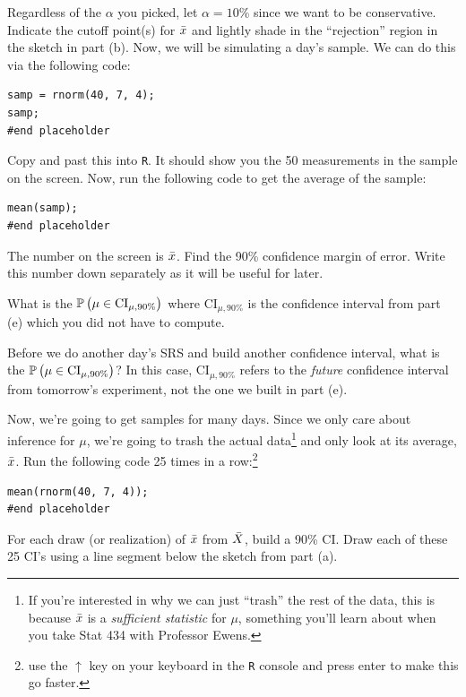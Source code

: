 \documentclass[12pt]{article}
\begin{document}
\easysubproblem Regardless of the $\alpha$ you picked, let $\alpha = 10\%$ since we want to be conservative. Indicate the cutoff point(s) for $\bar{x}$ and lightly shade in the ``rejection'' region in the sketch in part (b).
\easysubproblem Now, we will be simulating a day's sample. We can do this via the following code:

\begin{verbatim}
samp = rnorm(40, 7, 4); 
samp; 
#end placeholder
\end{verbatim}

Copy and past this into \texttt{R}. It should show you the 50 measurements in the sample on the screen. Now, run the following code to get the average of the sample:

\begin{verbatim}
mean(samp);
#end placeholder
\end{verbatim}

The number on the screen is $\bar{x}$. Find the 90\% confidence margin of error. Write this number down separately as it will be useful for later.

\hardsubproblem What is the $\mathbb{P}\left(\mu \in \text{CI}_{\mu, 90\%}\right)$ where $\text{CI}_{\mu, 90\%}$ is the confidence interval from part (e) which you did not have to compute.

\easysubproblem Before we do another day's SRS and build another confidence interval, what is the $\mathbb{P}\left(\mu \in \text{CI}_{\mu, 90\%}\right)$? In this case, $\text{CI}_{\mu, 90\%}$ refers to the \textit{future} confidence interval from tomorrow's experiment, not the one we built in part (e).

\intermediatesubproblem Now, we're going to get samples for many days. Since we only care about inference for $\mu$, we're going to trash the actual data\footnote{If you're interested in why we can just ``trash'' the rest of the data, this is because $\bar{x}$ is a \textit{sufficient statistic} for $\mu$, something you'll learn about when you take Stat 434 with Professor Ewens.} and only look at its average, $\bar{x}$. Run the following code 25 times in a row:\footnote{use the $\uparrow$ key on your keyboard in the \texttt{R} console and press enter to make this go faster.}

\begin{verbatim}
mean(rnorm(40, 7, 4));
#end placeholder
\end{verbatim}

For each draw (or realization) of $\bar{x}$ from $\bar{X}$, build a 90\% CI. Draw each of these 25 CI's using a line segment below the sketch from part (a).
\end{document}
